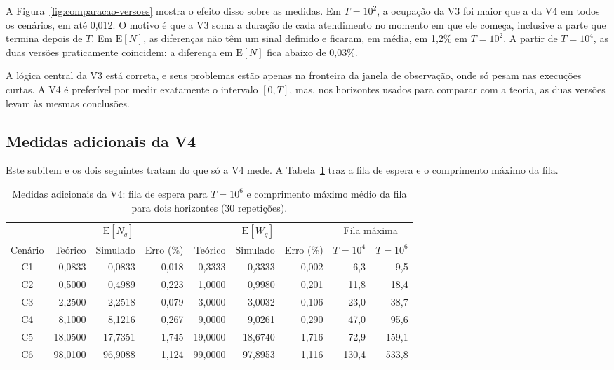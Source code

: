 \documentclass[
  article,      %
  10pt,         %
  oneside,
  a4paper,
  twocolumn,    %
  english,
  brazil        %
]{abntex2}
\newcommand{\EN}{\mathrm{E}[N]}
\newcommand{\ENq}{\mathrm{E}[N_q]}
\newcommand{\EWq}{\mathrm{E}[W_q]}
\begin{document}
A Figura~\ref{fig:comparacao-versoes} mostra o efeito disso sobre as medidas. Em $T=10^2$, a ocupação da V3 foi maior que a da V4 em todos os cenários, em até 0,012. O motivo é que a V3 soma a duração de cada atendimento no momento em que ele começa, inclusive a parte que termina depois de $T$. Em $\EN$, as diferenças não têm um sinal definido e ficaram, em média, em 1,2\% em $T=10^2$. A partir de $T=10^4$, as duas versões praticamente coincidem: a diferença em $\EN$ fica abaixo de 0,03\%.

A lógica central da V3 está correta, e seus problemas estão apenas na fronteira da janela de observação, onde só pesam nas execuções curtas. A V4 é preferível por medir exatamente o intervalo $[0,T]$, mas, nos horizontes usados para comparar com a teoria, as duas versões levam às mesmas conclusões.

\subsection{Medidas adicionais da V4}

Este subitem e os dois seguintes tratam do que só a V4 mede. A Tabela~\ref{tab:extras} traz a fila de espera e o comprimento máximo da fila.

\begin{table}[t]
  \centering
  \caption{Medidas adicionais da V4: fila de espera para $T=10^6$ e comprimento máximo médio da fila para dois horizontes (30 repetições).}
  \label{tab:extras}
  \small
  \begin{tabular}{crrrrrrrr}
    \toprule
    & \multicolumn{3}{c}{$\ENq$} & \multicolumn{3}{c}{$\EWq$} & \multicolumn{2}{c}{Fila máxima} \\
    \cmidrule(lr){2-4}\cmidrule(lr){5-7}\cmidrule(lr){8-9}
    Cenário & Teórico & Simulado & Erro (\%) & Teórico & Simulado & Erro (\%) & $T=10^4$ & $T=10^6$ \\
    \midrule
    C1 & 0,0833 & 0,0833 & 0,018 & 0,3333 & 0,3333 & 0,002 & 6,3 & 9,5 \\
    C2 & 0,5000 & 0,4989 & 0,223 & 1,0000 & 0,9980 & 0,201 & 11,8 & 18,4 \\
    C3 & 2,2500 & 2,2518 & 0,079 & 3,0000 & 3,0032 & 0,106 & 23,0 & 38,7 \\
    C4 & 8,1000 & 8,1216 & 0,267 & 9,0000 & 9,0261 & 0,290 & 47,0 & 95,6 \\
    C5 & 18,0500 & 17,7351 & 1,745 & 19,0000 & 18,6740 & 1,716 & 72,9 & 159,1 \\
    C6 & 98,0100 & 96,9088 & 1,124 & 99,0000 & 97,8953 & 1,116 & 130,4 & 533,8 \\
    \bottomrule
  \end{tabular}
\end{table}
\end{document}
